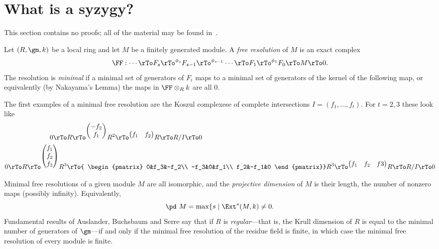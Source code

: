\section{What is a syzygy?}
This section contains no proofs; all of the material may be found in~\cite{Eisenbud1995}.

Let $(R,\gm, k)$ be a local ring and let $M$ be a finitely generated module. A \emph{free resolution} of $M$ is an exact complex
$$
\FF: \cdots \rTo F_s \rTo^{\phi_s} F_{s-1} \rTo^{\phi_{s-1}} \cdots \rTo F_1 \rTo^{\phi_1}  F_0 \rTo M \rTo 0.
$$
The resolution is \emph{minimal} if a minimal set of generators of $F_i$ maps to a minimal set of generators of the kernel of the following map,
or equivalently (by Nakayama's Lemma) the maps in $\FF\otimes_R k$ are all 0.

The first examples of a minimal free resolution are the Koszul complexese of complete intersections $I = (f_1,\dots, f_t)$. For $t = 2,3$ these look like
$$
\begin{aligned}
 0\rTo &R \rTo^{
\begin{pmatrix}
-f_2\\f_1
\end{pmatrix}}
 R^2\rTo^{
 \begin{pmatrix}
f_1&f_2
\end{pmatrix}}
 R \rTo R/I \rTo 0\\
0\rTo R \rTo^{
\begin{pmatrix}
f_1\\f_2\\f_3
\end{pmatrix}} R^3&\rTo{
\begin{pmatrix}
 0&f_3&-f_2\\
 -f_3&0&f_1\\
 f_2&-f_1&0
\end{pmatrix}}
 R^3\rTo^{
 \begin{pmatrix}
f_1&f_2&f3
\end{pmatrix}}R \rTo R/I \rTo 0
\end{aligned}
$$

Minimal free resolutions of a given module $M$ are all isomorphic, and the \emph{projective dimension}  of $M$ is their length, the number of nonzero
maps (possibly infinity). Equivalently, 
$$
\pd\ M = \max\{s \mid \Ext^s(M,k) \neq 0.
$$
Fundamental
results of Auslander, Buchsbaum and Serre say that if $R$ is \emph{regular}---that is, the Krull dimension of $R$ is equal to the minimal number
of generators of $\gm$---if and only if the minimal free resolution of the residue field is finite, in which case
the minimal free resolution of every module is finite.


